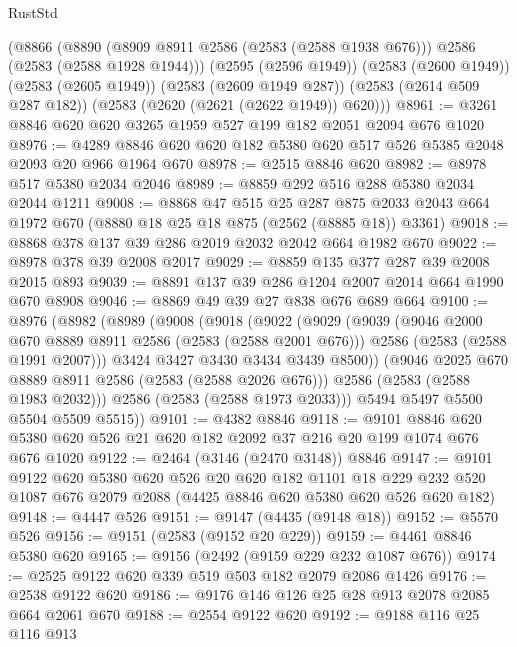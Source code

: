 \begin{lexlean}{RustStd}
\begin{coremodule}
    (@8866
      (@8890 (@8909 @8911 @2586 (@2583 (@2588 @1938 @676))) @2586 (@2583 (@2588 @1928 @1944)))
      (@2595 (@2596 @1949))
      (@2583 (@2600 @1949))
      (@2583 (@2605 @1949))
      (@2583 (@2609 @1949 @287))
      (@2583 (@2614 @509 @287 @182))
      (@2583 (@2620 (@2621 (@2622 @1949)) @620)))
@8961 := @3261 @8846 @620 @620 @3265 @1959 @527 @199 @182 @2051 @2094 @676 @1020
@8976 := @4289 @8846 @620 @620 @182 @5380 @620 @517 @526 @5385 @2048 @2093 @20 @966 @1964 @670
@8978 := @2515 @8846 @620
@8982 := @8978 @517 @5380 @2034 @2046
@8989 := @8859 @292 @516 @288 @5380 @2034 @2044 @1211
@9008 := @8868
    @47
    @515
    @25
    @287
    @875
    @2033
    @2043
    @664
    @1972
    @670
    (@8880 @18 @25 @18 @875 (@2562 (@8885 @18)) @3361)
@9018 := @8868 @378 @137 @39 @286 @2019 @2032 @2042 @664 @1982 @670
@9022 := @8978 @378 @39 @2008 @2017
@9029 := @8859 @135 @377 @287 @39 @2008 @2015 @893
@9039 := @8891 @137 @39 @286 @1204 @2007 @2014 @664 @1990 @670 @8908
@9046 := @8869 @49 @39 @27 @838 @676 @689 @664
@9100 := @8976
    (@8982
      (@8989
        (@9008
          (@9018
            (@9022
              (@9029
                (@9039
                  (@9046 @2000 @670 @8889 @8911 @2586 (@2583 (@2588 @2001 @676)))
                  @2586
                  (@2583 (@2588 @1991 @2007)))
                @3424
                @3427
                @3430
                @3434
                @3439
                @8500))
            (@9046 @2025 @670 @8889 @8911 @2586 (@2583 (@2588 @2026 @676)))
            @2586
            (@2583 (@2588 @1983 @2032)))
          @2586
          (@2583 (@2588 @1973 @2033)))
        @5494
        @5497
        @5500
        @5504
        @5509
        @5515))
@9101 := @4382 @8846
@9118 := @9101
    @8846
    @620
    @5380
    @620
    @526
    @21
    @620
    @182
    @2092
    @37
    @216
    @20
    @199
    @1074
    @676
    @676
    @1020
@9122 := @2464 (@3146 (@2470 @3148)) @8846
@9147 := @9101
    @9122
    @620
    @5380
    @620
    @526
    @20
    @620
    @182
    @1101
    @18
    @229
    @232
    @520
    @1087
    @676
    @2079
    @2088
    (@4425 @8846 @620 @5380 @620 @526 @620 @182)
@9148 := @4447 @526
@9151 := @9147 (@4435 (@9148 @18))
@9152 := @5570 @526
@9156 := @9151 (@2583 (@9152 @20 @229))
@9159 := @4461 @8846 @5380 @620
@9165 := @9156 (@2492 (@9159 @229 @232 @1087 @676))
@9174 := @2525 @9122 @620 @339 @519 @503 @182 @2079 @2086 @1426
@9176 := @2538 @9122 @620
@9186 := @9176 @146 @126 @25 @28 @913 @2078 @2085 @664 @2061 @670
@9188 := @2554 @9122 @620
@9192 := @9188 @116 @25 @116 @913

\end{coremodule}
\end{lexlean}
